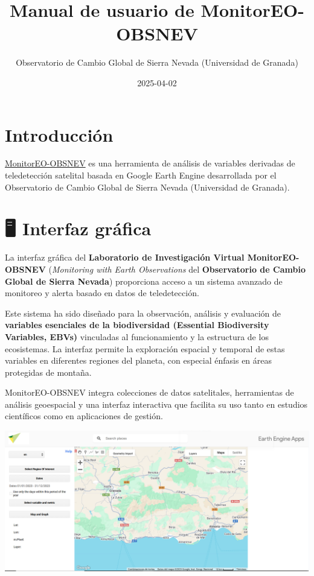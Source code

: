 \documentclass[
]{book}
\title{Manual de usuario de MonitorEO-OBSNEV}
\author{Observatorio de Cambio Global de Sierra Nevada (Universidad de Granada)}
\date{2025-04-02}
\begin{document}
\maketitle

{
\setcounter{tocdepth}{1}
\tableofcontents
}
\chapter{Introducción}\label{intro}

\href{https://sl.ugr.es/monitoreoobsnev}{MonitorEO-OBSNEV} es una herramienta de análisis de variables derivadas de teledetección satelital basada en Google Earth Engine desarrollada por el Observatorio de Cambio Global de Sierra Nevada (Universidad de Granada).

\chapter{🖥️ Interfaz gráfica}\label{interfaz}

La interfaz gráfica del \textbf{Laboratorio de Investigación Virtual MonitorEO-OBSNEV} (\emph{Monitoring with Earth Observations} del \textbf{Observatorio de Cambio Global de Sierra Nevada}) proporciona acceso a un sistema avanzado de monitoreo y alerta basado en datos de teledetección.

Este sistema ha sido diseñado para la observación, análisis y evaluación de \textbf{variables esenciales de la biodiversidad (Essential Biodiversity Variables, EBVs)} vinculadas al funcionamiento y la estructura de los ecosistemas. La interfaz permite la exploración espacial y temporal de estas variables en diferentes regiones del planeta, con especial énfasis en áreas protegidas de montaña.

MonitorEO-OBSNEV integra colecciones de datos satelitales, herramientas de análisis geoespacial y una interfaz interactiva que facilita su uso tanto en estudios científicos como en aplicaciones de gestión.

\includegraphics{assets/InterfazNew.png}
\end{document}
